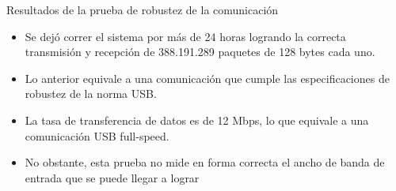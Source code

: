 \begin{frame}{Resultados de la prueba de robustez de la comunicación}
	\begin{itemize}
			\item Se dejó correr el sistema por más de 24 horas logrando la correcta transmisión y recepción de 388.191.289 paquetes de 128 bytes cada uno.
		\item Lo anterior equivale a una comunicación que cumple las especificaciones de robustez de la norma USB.
		\item La tasa de transferencia de datos es de 12 Mbps, lo que equivale a una comunicación USB full-speed.
		\item No obstante, esta prueba no mide en forma correcta el ancho de banda de entrada que se puede llegar a lograr
	\end{itemize}
\end{frame}